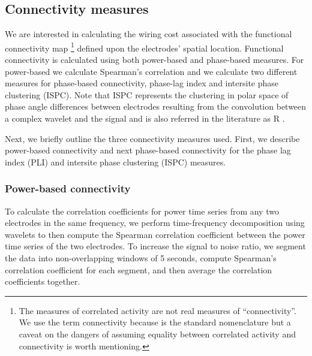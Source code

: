 \documentclass[11pt, onecolumn]{article}
\begin{document}
\subsection{Connectivity measures}
We are interested in calculating the wiring cost associated with the functional connectivity map \footnote{The measures of correlated activity are not real measures of “connectivity”. We use the term connectivity because is the standard nomenclature but a caveat on the dangers of assuming equality between correlated activity and connectivity is worth mentioning.} defined upon the electrodes' spatial location. Functional connectivity is calculated using both power-based and phase-based measures. For power-based we calculate Spearman's correlation and we calculate two different measures for phase-based connectivity, phase-lag index \citep{stam2007phase} and intersite phase clustering (ISPC). Note that ISPC represents the clustering in polar space of phase angle differences between electrodes resulting from the convolution between a complex wavelet and the signal and is also referred in the literature as R \citep{cohen2014analyzing}. 

Next, we briefly outline the three connectivity measures used. First, we describe power-based connectivity and next phase-based connectivity for the phase lag index (PLI) and intersite phase clustering (ISPC) measures. 

\subsubsection{Power-based connectivity}
To calculate the correlation coefficients for power time series from any two electrodes in the same frequency, we perform time-frequency decomposition using wavelets to then compute the Spearman correlation coefficient between the power time series of the two electrodes. 
To increase the signal to noise ratio, we segment the data into non-overlapping windows of 5 seconds, compute Spearman's correlation coefficient for each segment, and then average the correlation coefficients together. 
\end{document}
